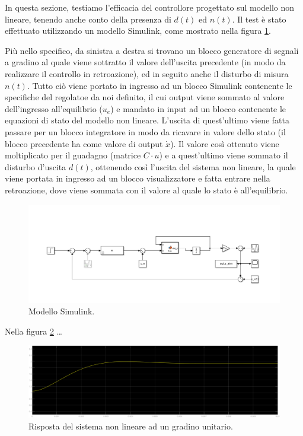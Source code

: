 \documentclass[a4paper, 11pt]{article}
\begin{document}
In questa sezione, testiamo l'efficacia del controllore progettato sul modello non lineare, tenendo anche conto della presenza di $d(t)$ ed $n(t)$. 
Il test \`e stato effettuato utilizzando un modello Simulink, come mostrato nella figura \ref*{fig:simulink}.

Pi\`u nello specifico,
da sinistra a destra si trovano un blocco generatore di segnali a gradino al quale viene sottratto il valore dell'uscita precedente (in modo da realizzare il controllo in retroazione), ed in seguito anche il disturbo di misura $n(t)$. 
Tutto ci\`o viene portato in ingresso ad un blocco Simulink contenente le specifiche del regolatoe da noi definito, il cui output viene sommato al valore dell'ingresso all'equilibrio ($u_e$) e mandato in input ad un blocco contenente
le equazioni di stato del modello non lineare. L'uscita di quest'ultimo viene fatta passare per un blocco integratore in modo da ricavare in valore dello stato (il blocco precedente ha come valore di output $\dot{x}$). Il valore cos\`i ottenuto 
viene moltiplicato per il guadagno (matrice $C\cdot u$) e a quest'ultimo viene sommato il disturbo d'uscita $d(t)$, ottenendo cos\`i l'uscita del sistema non lineare, la quale viene portata in ingresso ad un blocco visualizzatore e fatta entrare nella retroazione,
dove viene sommata con il valore al quale lo stato \`e all'equilibrio.


\begin{figure}
	\centering
	\includegraphics[width=0.9\linewidth]{./images/simulink1.png}
	\caption{Modello Simulink.}
	\label{fig:simulink}
\end{figure}

Nella figura \ref*{fig:step_response_non_lin_uni} \dots

\begin{figure}[h!]
	\centering
	\includegraphics[width=0.9\linewidth]{./images/stepRespNonLinUni.png}
	\caption{Risposta del sistema non lineare ad un gradino unitario.}
	\label{fig:step_response_non_lin_uni}
\end{figure}
\end{document}
